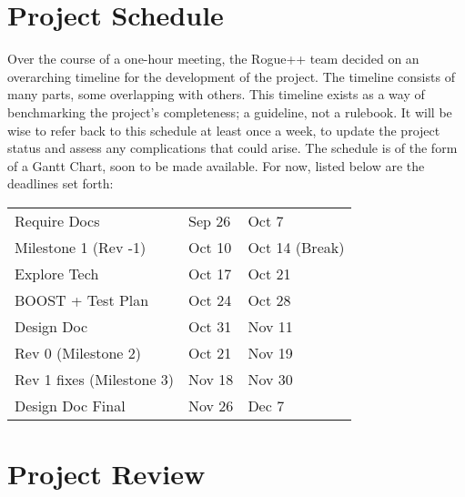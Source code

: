 \documentclass{article}
\begin{document}
\section{Project Schedule}

Over the course of a one-hour meeting, the Rogue++ team decided on an overarching timeline for the development of the project. The timeline consists of many parts, some overlapping with others. This timeline exists as a way of benchmarking the project's completeness; a guideline, not a rulebook. It will be wise to refer back to this schedule at least once a week, to update the project status and assess any complications that could arise. The schedule is of the form of a Gantt Chart, soon to be made available. For now, listed below are the deadlines set forth:

\bigskip

\begin{tabular}{lll}
	Require Docs				&	Sep 26	&	Oct 7\\
	Milestone 1	(Rev -1)		&	Oct 10	&	Oct 14 (Break)\\
	Explore Tech				&	Oct 17	&	Oct 21\\
	BOOST + Test Plan			&	Oct 24	&	Oct 28\\
	Design Doc 					&	Oct 31	&	Nov 11\\
	Rev 0 (Milestone 2)			&	Oct 21	&	Nov 19\\
	Rev 1 fixes	(Milestone 3)	&	Nov 18	&	Nov 30\\
	Design Doc Final			&	Nov 26	&	Dec 7
\end{tabular}

\section{Project Review}
\end{document}
